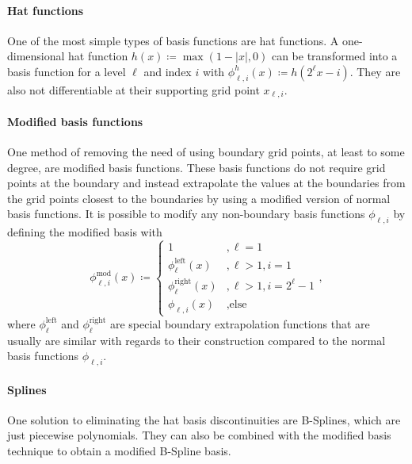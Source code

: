 \documentclass[
  a4paper,  %
  twoside,  %
  bibliography=totoc,
  headsepline,
  cleardoublepage=empty,
  parskip=half,
  draft=false
]{scrbook}
\begin{document}
\paragraph{Hat functions}
One of the most simple types of basis functions are hat functions.
A one-dimensional hat function $h(x) \coloneqq \max(1 - |x|,0)$ can be transformed into a basis function for a level $\ell$ and index $i$ with $\phi^h_{\ell,i}(x) \coloneqq h(2^\ell x-i)$.
They are also not differentiable at their supporting grid point $x_{\ell,i}$.

\paragraph{Modified basis functions}
One method of removing the need of using boundary grid points, at least to some degree, are modified basis functions.
These basis functions do not require grid points at the boundary and instead extrapolate the values at the boundaries from the grid points closest to the boundaries by using a modified version of normal basis functions.
It is possible to modify any non-boundary basis functions $\phi_{\ell,i}$ by defining the modified basis with
\begin{equation}
\phi^{\mathrm{mod}}_{\ell,i}(x) \coloneqq
\begin{cases}
1 &, \ell=1\\
\phi^{\mathrm{left}}_{\ell}(x)&, \ell>1, i=1\\
\phi^{\mathrm{right}}_{\ell}(x)&, \ell>1, i=2^\ell - 1\\
\phi_{\ell,i}(x)&, \text{else}
\end{cases},
\nonumber
\end{equation}
where $\phi^{\text{left}}_{\ell}$ and $\phi^{\text{right}}_{\ell}$ are special boundary extrapolation functions that are usually are similar with regards to their construction compared to the normal basis functions $\phi_{\ell,i}$.

\paragraph{Splines}
One solution to eliminating the hat basis discontinuities are B-Splines, which are just piecewise polynomials.
They can also be combined with the modified basis technique to obtain a modified B-Spline basis.
\end{document}
